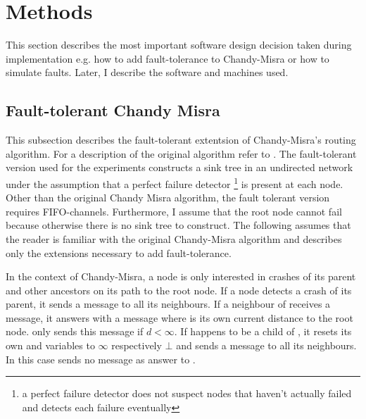 \section{Methods}
\label{sec:methods}
This section describes the most important software design decision taken during implementation e.g. how to add fault-tolerance to Chandy-Misra or how to simulate faults.
Later, I describe the software and machines used.

\subsection {Fault-tolerant Chandy Misra}
\label{ssec:fault-tolerant-chandy-misra}
This subsection describes the fault-tolerant extentsion of Chandy-Misra's routing algorithm. 
For a description of the original algorithm refer to \cite[page 56]{Fokkink:2018}.
The fault-tolerant version used for the experiments constructs a sink tree in an undirected network under the assumption that a perfect failure detector \footnote{a perfect failure detector does not suspect nodes that haven't actually failed and detects each failure eventually} is present at each node. 
Other than the original Chandy Misra algorithm, the fault tolerant version requires FIFO-channels.
Furthermore, I assume that the root node cannot fail because otherwise there is no sink tree to construct. 
The following assumes that the reader is familiar with the original Chandy-Misra algorithm and describes only the extensions necessary to add fault-tolerance.

In the context of Chandy-Misra, a node is only interested in crashes of its parent and other ancestors on its path to the root node.
If a node  detects a crash of its parent, it sends a  message to all its neighbours. 
If a neighbour  of  receives a  message, it answers with a  message where  is its own current distance to the root node. 
 only sends this message if $d < \infty $.
If  happens to be a child of , it resets its own  and  variables to $\infty$ respectively $\bot$ and sends a  message to all its neighbours.
In this case  sends no  message as answer to .

